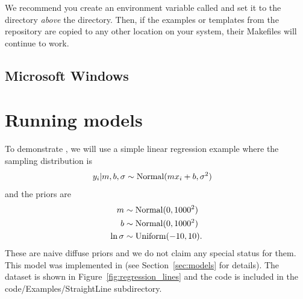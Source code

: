 \documentclass[article]{jss}
\begin{document}
We recommend you create an environment variable called 
and set it to the directory {\em above} the  directory. Then,
if the examples or templates from the  repository are copied
to any other location on your system, their Makefiles will continue to work.

\subsection{Microsoft Windows}


\section{Running models}
To demonstrate ,
we will use a simple linear regression example where the
sampling distribution is
\begin{align}
y_i | m, b, \sigma &\sim \textnormal{Normal}(mx_i + b, \sigma^2)
\end{align}
and the priors are
\begin{align}
m &\sim \textnormal{Normal}(0, 1000^2)\\
b &\sim \textnormal{Normal}(0, 1000^2)\\
\ln\sigma &\sim \textnormal{Uniform}(-10, 10).
\end{align}
These are naive diffuse priors and we do not claim any special status for them.
This model was implemented in 
(see Section~\ref{sec:models} for details).
The dataset is shown in Figure~\ref{fig:regression_lines}
and the code is included in the
code/Examples/StraightLine subdirectory.
\end{document}
